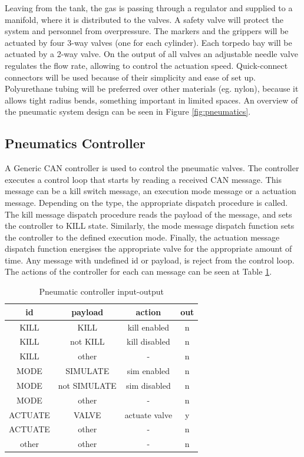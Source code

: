 Leaving from the tank, the gas is passing through a regulator and supplied to a manifold, where it is distributed to the valves. A safety valve will protect the system and personnel from overpressure. The markers and the grippers will be actuated by four 3-way valves (one for each cylinder). Each torpedo bay will be actuated by a 2-way valve. On the output of all valves an adjustable needle valve regulates the flow rate, allowing to control the actuation speed. Quick-connect connectors will be used because of their simplicity and ease of set up. Polyurethane tubing will be preferred over other materials (eg. nylon), because it allows tight radius bends, something important in limited spaces. An overview of the pneumatic system design can be seen in Figure \ref{fig:pneumatics}.

\subsection{Pneumatics Controller}
A Generic CAN controller is used to control the pneumatic valves. The controller executes a control loop that starts by reading a received CAN message. This message can be a kill switch message, an execution mode message or a actuation message. Depending on the type, the appropriate dispatch procedure is called. The kill message dispatch procedure reads the payload of the message, and sets the controller to KILL state. Similarly, the mode message dispatch function sets the controller to the defined execution mode. Finally, the actuation message dispatch function energises the appropriate valve for the appropriate amount of time. Any message with undefined id or payload, is reject from the control loop. The actions of the controller for each can message can be seen at Table \ref{table:can_msg}.

\begin{table}
\centering
    \caption{Pneumatic controller input-output}
    \begin{tabular}{|c|c|c|c|} \hline
    \label{table:can_msg}
	\textbf{id} & \textbf{payload} & \textbf{action} & \textbf{out} \\ \hline
        KILL & KILL & kill enabled & n\\ \hline
        KILL & not KILL & kill disabled & n \\ \hline
        KILL & other & - & n \\ \hline
        MODE & SIMULATE & sim enabled & n \\ \hline
		MODE & not SIMULATE & sim disabled & n \\ \hline
		MODE & other & - & n \\ \hline
		ACTUATE & VALVE & actuate valve & y \\ \hline
		ACTUATE & other & - & n \\ \hline
		other & other & - & n \\ \hline
    \end{tabular}
\end{table}